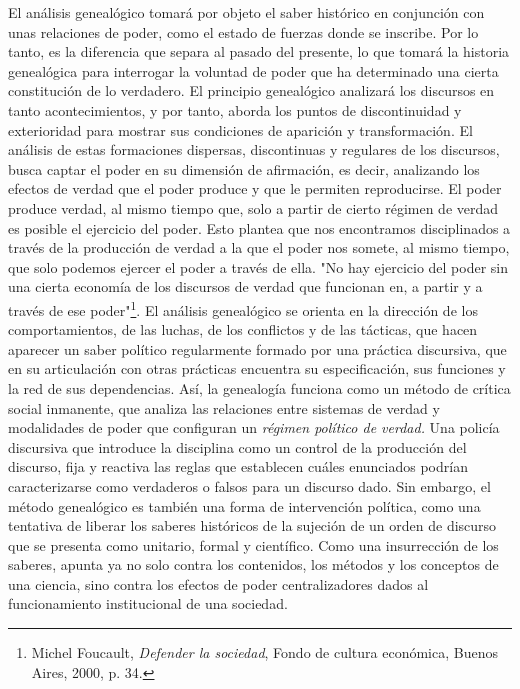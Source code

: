 \documentclass{book}
\begin{document}
El análisis genealógico tomará por objeto el saber histórico en
conjunción con unas relaciones de poder, como el estado de fuerzas donde
se inscribe. Por lo tanto, es la diferencia que separa al pasado del
presente, lo que tomará la historia genealógica para interrogar la
voluntad de poder que ha determinado una cierta constitución de lo
verdadero. El principio genealógico analizará los discursos en tanto
acontecimientos, y por tanto, aborda los puntos de discontinuidad y
exterioridad para mostrar sus condiciones de aparición y transformación.
El análisis de estas formaciones dispersas, discontinuas y regulares de
los discursos, busca captar el poder en su dimensión de afirmación, es
decir, analizando los efectos de verdad que el poder produce y que le
permiten reproducirse. El poder produce verdad, al mismo tiempo que,
solo a partir de cierto régimen de verdad es posible el ejercicio del
poder. Esto plantea que nos encontramos disciplinados a través de la
producción de verdad a la que el poder nos somete, al mismo tiempo, que
solo podemos ejercer el poder a través de ella. "No hay ejercicio del
poder sin una cierta economía de los discursos de verdad que funcionan
en, a partir y a través de ese poder"\footnote{Michel Foucault,
  \emph{Defender la sociedad}, Fondo de cultura económica, Buenos Aires,
  2000, p. 34.}. El análisis genealógico se orienta en la dirección de
los comportamientos, de las luchas, de los conflictos y de las tácticas,
que hacen aparecer un saber político regularmente formado por una
práctica discursiva, que en su articulación con otras prácticas
encuentra su especificación, sus funciones y la red de sus dependencias.
Así, la genealogía funciona como un método de crítica social inmanente,
que analiza las relaciones entre sistemas de verdad y modalidades de
poder que configuran un \emph{régimen político de verdad.} Una policía
discursiva que introduce la disciplina como un control de la producción
del discurso, fija y reactiva las reglas que establecen cuáles
enunciados podrían caracterizarse como verdaderos o falsos para un
discurso dado. Sin embargo, el método genealógico es también una forma
de intervención política, como una tentativa de liberar los saberes
históricos de la sujeción de un orden de discurso que se presenta como
unitario, formal y científico. Como una insurrección de los saberes,
apunta ya no solo contra los contenidos, los métodos y los conceptos de
una ciencia, sino contra los efectos de poder centralizadores dados al
funcionamiento institucional de una sociedad.
\end{document}
